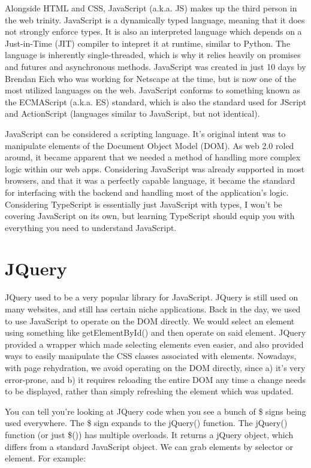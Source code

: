 \documentclass{article}
\begin{document}
Alongside HTML and CSS, JavaScript (a.k.a. JS) makes up the third person in the web trinity. JavaScript is a
dynamically typed language, meaning that it does not strongly enforce types. It is also an interpreted language
which depends on a Just-in-Time (JIT) compiler to intepret it at runtime, similar to Python. The language is
inherently single-threaded, which is why it relies heavily on promises and futures and asynchronous methods.
JavaScript was created in just 10 days by Brendan Eich who was working for Netscape at the time, but is now one
of the most utilized languages on the web. JavaScript conforms to something known as the ECMAScript (a.k.a. ES)
standard, which is also the standard used for JScript and ActionScript (languages similar to JavaScript, but
not identical).

JavaScript can be considered a scripting language. It's original intent was to manipulate elements of the
Document Object Model (DOM). As web 2.0 roled around, it became apparent that we needed a method of handling
more complex logic within our web apps. Considering JavaScript was already supported in most browsers, and that
it was a perfectly capable language, it became the standard for interfacing with the backend and handling most
of the application's logic. Considering TypeScript is essentially just JavaScript with types, I won't be
covering JavaScript on its own, but learning TypeScript should equip you with everything you need to understand
JavaScript.

\section{JQuery}

JQuery used to be a very popular library for JavaScript. JQuery is still used on many websites, and still has
certain niche applications. Back in the day, we used to use JavaScript to operate on the DOM directly. We would
select an element using something like getElementById() and then operate on said element. JQuery provided a
wrapper which made selecting elements even easier, and also provided ways to easily manipulate the CSS classes
associated with elements. Nowadays, with page rehydration, we avoid operating on the DOM directly, since a) it's
very error-prone, and b) it requires reloading the entire DOM any time a change needs to be displayed, rather
than simply refreshing the element which was updated.

You can tell you're looking at JQuery code when you see a bunch of \$ signs being used everywhere. The \$ sign
expands to the jQuery() function. The jQuery() function (or just \$()) has multiple overloads. It returns a
jQuery object, which differs from a standard JavaScript object. We can grab elements by selector or element.
For example:
\end{document}
